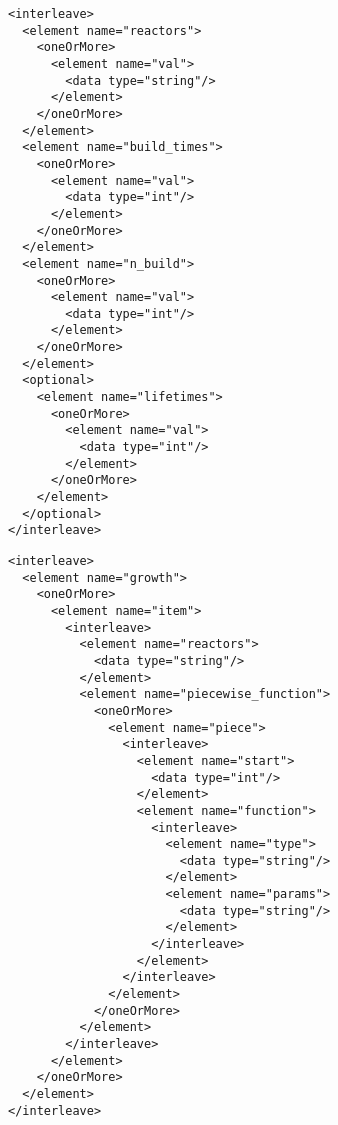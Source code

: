 \documentclass[11pt,letterpaper]{article}
\newenvironment{code}{\captionsetup{type=listing}}{}
\begin{document}
\begin{code}
\begin{verbatim}
<interleave>
  <element name="reactors">
    <oneOrMore>
      <element name="val">
        <data type="string"/>
      </element>
    </oneOrMore>
  </element>
  <element name="build_times">
    <oneOrMore>
      <element name="val">
        <data type="int"/>
      </element>
    </oneOrMore>
  </element>
  <element name="n_build">
    <oneOrMore>
      <element name="val">
        <data type="int"/>
      </element>
    </oneOrMore>
  </element>
  <optional>
    <element name="lifetimes">
      <oneOrMore>
        <element name="val">
          <data type="int"/>
        </element>
      </oneOrMore>
    </element>
  </optional>
</interleave>
\end{verbatim}
\label{code:man_reac}
\end{code}

\begin{code}

\begin{verbatim}
<interleave>
  <element name="growth">
    <oneOrMore>
      <element name="item">
        <interleave>
          <element name="reactors">
            <data type="string"/>
          </element>
          <element name="piecewise_function">
            <oneOrMore>
              <element name="piece">
                <interleave>
                  <element name="start">
                    <data type="int"/>
                  </element>
                  <element name="function">
                    <interleave>
                      <element name="type">
                        <data type="string"/>
                      </element>
                      <element name="params">
                        <data type="string"/>
                      </element>
                    </interleave>
                  </element>
                </interleave>
              </element>
            </oneOrMore>
          </element>
        </interleave>
      </element>
    </oneOrMore>
  </element>
</interleave>
\end{verbatim}
\label{code:fun_reac}
\end{code}
\end{document}
